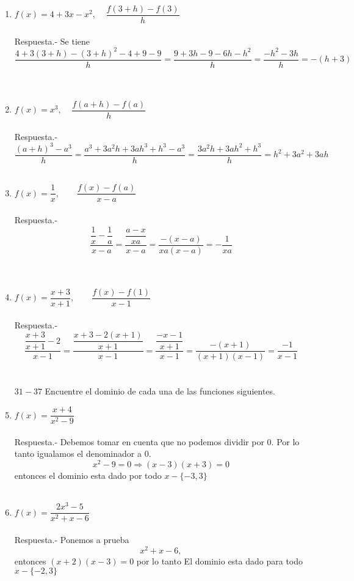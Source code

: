 \begin{enumerate}
    \item $f(x)=4+3x-x^2, \;\;\;\; \dfrac{f(3+h)-f(3)}{h}$\\\\
	Respuesta.-\; Se tiene $$\dfrac{4 + 3(3+h)-(3+h)^2-4+9-9}{h}=\dfrac{9+3h-9-6h-h^2}{h}=\dfrac{-h^2 -3h}{h}=-(h+3)$$\\\\

    \item $f(x)=x^3, \;\;\;\; \dfrac{f(a+h)-f(a)}{h}$\\\\
	Respuesta.-\; $\dfrac{(a+h)^3 - a^3}{h}=\dfrac{a^3 + 3a^2h + 3ah^3 + h^3 - a^3}{h}=\dfrac{3a^2h + 3ah^2 + h^3}{h}=h^2 + 3a^2 + 3ah$\\\\ 

    \item $f(x)=\dfrac{1}{x}, \qquad \dfrac{f(x) - f(a)}{x-a}$\\\\
	Respuesta.-\; $$\dfrac{\dfrac{1}{x} - \dfrac{1}{a}}{x-a} = \dfrac{\dfrac{a-x}{xa}}{x-a}=\dfrac{-(x-a)}{xa(x-a)}=-\dfrac{1}{xa}$$\\\ 

    \item $f(x)=\dfrac{x+3}{x+1}, \qquad \dfrac{f(x)-f(1)}{x-1}$\\\\
	Respuesta.-\; $$\dfrac{\dfrac{x+3}{x+1}-2}{x-1} = \dfrac{\dfrac{x+3 - 2(x+1)}{x+1}}{x-1}=\dfrac{\dfrac{-x-1}{x+1}}{x-1}=\dfrac{-(x+1)}{(x+1)(x-1)}=\dfrac{-1}{x-1}$$\\\\

    $31-37$ Encuentre el dominio de cada una de las funciones siguientes.\\

    \item $f(x)=\dfrac{x+4}{x^2 - 9}$\\\\
	Respuesta.-\; Debemos tomar en cuenta que no podemos dividir por $0$. Por lo tanto igualamos el denominador a $0$. $$x^2-9=0 \Rightarrow (x-3)(x+3)=0$$ entonces el dominio esta dado por todo $x - \lbrace -3,3\rbrace$\\\\  

    \item $f(x)=\dfrac{2x^3-5}{x^2+x-6}$\\\\
	Respuesta.-\; Ponemos a prueba $$x^2+x-6,$$ entonces $(x+2)(x-3)=0$ por lo tanto El dominio esta dado para todo $x - \lbrace -2,3\rbrace$\\\\


\end{enumerate}
